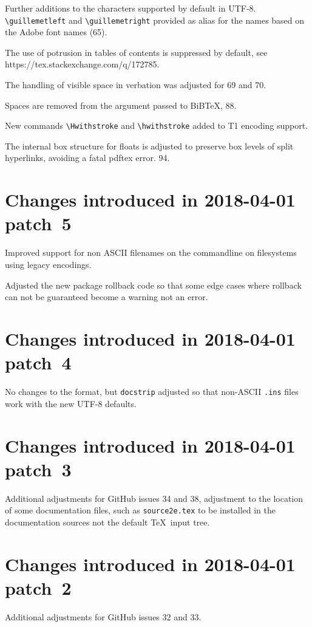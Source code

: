 \documentclass{ltxguide}
\newcommand\ghissue[1]{#1}
\newcommand\sxquestion[1]{https://tex.stackexchange.com\slash q\slash #1}
\newcommand\ghissue[1]{%
    \href{https://github.com/latex3/latex2e/issues/#1}{#1}}
\newcommand\sxquestion[1]{%
     \url{https://tex.stackexchange.com/q/#1}}
\begin{document}
Further additions to the characters supported by default in UTF-8.
\verb|\guillemetleft| and \verb|\guillemetright| provided as alias for
the names based on the Adobe font names (\ghissue{65}).

The use of potrusion in tables of contents is suppressed by default,
see \sxquestion{172785}.

The handling of visible space in verbation was adjusted for
\ghissue{69} and \ghissue{70}.

Spaces are removed from the argument passed to BiBTeX, \ghissue{88}.

New commands \verb|\Hwithstroke| and \verb|\hwithstroke| added to T1 encoding support.

The internal box structure for floats is adjusted to preserve box
levels of split hyperlinks, avoiding a fatal pdftex error. \ghissue{94}.


\section{Changes  introduced in 2018-04-01 patch~5}
Improved support for non ASCII filenames on the commandline on
filesystems using legacy encodings.

Adjusted the new package rollback code so that some edge cases where rollback
can not be guaranteed become a warning not an error.

\section{Changes  introduced in 2018-04-01 patch~4}
No changes to the format, but \texttt{docstrip} adjusted so that non-ASCII
\texttt{.ins} files work with the new UTF-8 defaults.

\section{Changes  introduced in 2018-04-01 patch~3}
Additional adjustments for GitHub issues \ghissue{34} and \ghissue{38}, adjustment to the
location of some documentation files, such as \texttt{source2e.tex} to
be installed in the documentation sources not the default \TeX\ input
tree.


\section{Changes  introduced in 2018-04-01 patch~2}
Additional adjustments for GitHub issues  \ghissue{32} and  \ghissue{33}.
\end{document}
